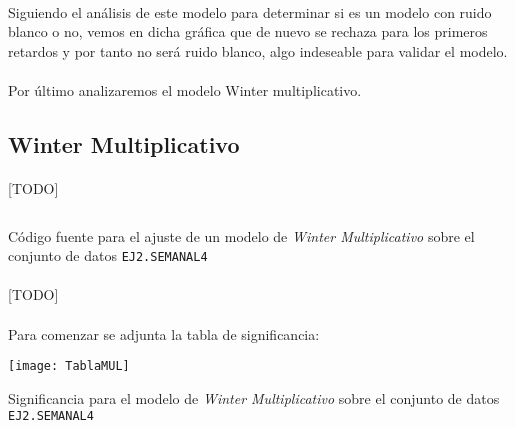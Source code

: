 \documentclass[a4paper, spanish]{article}
\begin{document}
      \paragraph{}
      Siguiendo el análisis de este modelo para determinar si es un modelo con ruido blanco o no, vemos en dicha gráfica que de nuevo se rechaza para los primeros retardos y por tanto no será ruido blanco, algo indeseable para validar el modelo.

      \paragraph{}
      Por último analizaremos el modelo Winter multiplicativo.

    \subsection{Winter Multiplicativo}

      \paragraph{}
      [TODO]

      \begin{listing}[htb!]
        \centering
        \inputminted{SAS}{./res/code/b-01-esm-wintermul.sas}
        \caption{Código fuente para el ajuste de un modelo de \emph{Winter Multiplicativo} sobre el conjunto de datos \texttt{EJ2.SEMANAL4}}
        \label{code:b_winter_multiplicative_esm}
      \end{listing}

      \paragraph{}
      [TODO]

      \paragraph{}
      Para comenzar se adjunta la tabla de significancia:

      \begin{table}[htb!]
        \centering
        \texttt{[image: TablaMUL]}
        \caption{Significancia para el modelo de \emph{Winter Multiplicativo} sobre el conjunto de datos \texttt{EJ2.SEMANAL4}}
        \label{table:b_winter_multiplicative_significance}
      \end{table}
\end{document}
